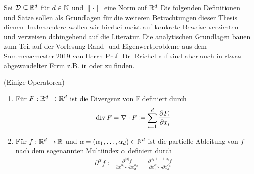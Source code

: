 Sei $\mathcal{D} \subseteq \mathbb{R}^d$ für $d\in \mathbb{N}$ und $\lVert \cdot \rVert$ eine Norm auf $\mathbb{R}^d$
Die folgenden Definitionen und Sätze sollen als Grundlagen für die weiteren Betrachtungen dieser Thesis dienen. Insbesondere wollen wir hierbei meist auf konkrete Beweise verzichten und verweisen dahingehend auf die Literatur. 
Die analytischen Grundlagen bauen zum Teil auf der Vorlesung Rand- und Eigenwertprobleme aus dem Sommersemester 2019 von Herrn Prof. Dr. Reichel auf sind aber auch in etwas abgewandelter Form z.B. in \cite{dobrowolski2010angewandte} oder \cite{evans10} zu finden.
\begin{Definition}(Einige Operatoren)
	\begin{enumerate}[label=(\alph*)]
		\item Für $F: \mathbb{R}^d \to \mathbb{R}^d$ ist die \underline{Divergenz} von F definiert durch
			\begin{align*}
				\operatorname{div} F = \nabla \cdot F \coloneqq \sum_{i=1}^{d} \frac{\partial F_i}{ \partial x_i}
			\end{align*}
		\item Für $f: \mathbb{R}^d \to \mathbb{R}$ und $\alpha = (\alpha_1,\dots,\alpha_d) \in \mathbb{N}^d$ ist die partielle Ableitung von $f$ nach dem sogenannten Multiindex $\alpha$ definiert durch
			\begin{align*}
				\partial^{\alpha}f \coloneqq 
				\frac{\partial^{|\alpha|} f}{\partial x_1 ^{\alpha_1} \cdots  \partial x_d^{\alpha_d} } 
				=\frac{\partial^{\alpha_1+\dots +\alpha_d} f}{\partial x_1 ^{\alpha_1} \cdots  \partial x_d^{\alpha_d} } 
			\end{align*}
	\end{enumerate}
\end{Definition}



